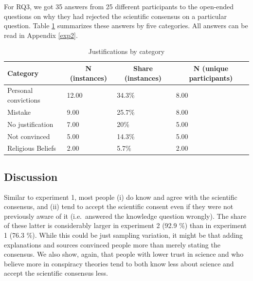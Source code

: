 \documentclass[
  doc,floatsintext]{apa6}
\begin{document}
For RQ3, we got 35 answers from 25 different participants to the open-ended questions on why they had rejected the scientific consensus on a particular question. Table \ref{tab:exp2-justifications} summarizes these answers by five categories. All answers can be read in Appendix \ref{exp2}.

\begin{table}[tbp]

\begin{center}
\begin{threeparttable}

\caption{\label{tab:exp2-justifications}Justifications by category}

\begin{tabular}{llll}
\toprule
Category & \multicolumn{1}{c}{N (instances)} & \multicolumn{1}{c}{Share (instances)} & \multicolumn{1}{c}{N (unique participants)}\\
\midrule
Personal convictions & 12.00 & 34.3\% & 8.00\\
Mistake & 9.00 & 25.7\% & 8.00\\
No justification & 7.00 & 20\% & 5.00\\
Not convinced & 5.00 & 14.3\% & 5.00\\
Religious Beliefs & 2.00 & 5.7\% & 2.00\\
\bottomrule
\end{tabular}

\end{threeparttable}
\end{center}

\end{table}

\subsection{Discussion}\label{discussion-1}

Similar to experiment 1, most people (i) do know and agree with the scientific consensus, and (ii) tend to accept the scientific consent even if they were not previously aware of it (i.e.~answered the knowledge question wrongly). The share of these latter is considerably larger in experiment 2 (92.9 \%) than in experiment 1 (76.3 \%). While this could be just sampling variation, it might be that adding explanations and sources convinced people more than merely stating the consensus. We also show, again, that people with lower trust in science and who believe more in conspiracy theories tend to both know less about science and accept the scientific consensus less.
\end{document}
